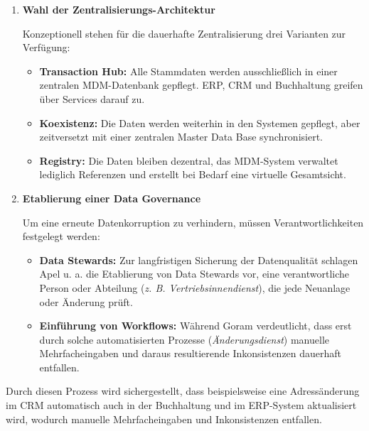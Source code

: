 \begin{enumerate}[label=\arabic*.), leftmargin=*]
\begin{itemize}
        \item \textbf{Festlegung des führenden Systems:} Hinsichtlich der Datenhoheit weist Gronau \cite[308]{4} darauf hin, dass bereits im Rahmen der Projektvorbereitung verbindlich entschieden werden muss, welches System für welche Informationen die primäre Hoheit besitzt. Goram \cite[36]{25} illustriert dies am Beispiel von Kundenstammsätzen: So könnte das \acs{CRM} für Marketingdaten federführend sein, während die Buchhaltung die Hoheit über zahlungsrelevante Informationen wie die Bankverbindung behält.
    \end{itemize}
    \item \textbf{Wahl der Zentralisierungs-Architektur} \par Konzeptionell stehen für die dauerhafte Zentralisierung drei Varianten zur Verfügung:
    \begin{itemize}
        \item \textbf{Transaction Hub:} Alle Stammdaten werden ausschließlich in einer zentralen \acs{MDM}-Datenbank gepflegt. \acs{ERP}, \acs{CRM} und Buchhaltung greifen über Services darauf zu.
        \item \textbf{Koexistenz:} Die Daten werden weiterhin in den Systemen gepflegt, aber zeitversetzt mit einer zentralen Master Data Base synchronisiert.
        \item \textbf{Registry:} Die Daten bleiben dezentral, das \acs{MDM}-System verwaltet lediglich Referenzen und erstellt bei Bedarf eine virtuelle Gesamtsicht.
    \end{itemize}
    \item \textbf{Etablierung einer Data Governance} \par Um eine erneute Datenkorruption zu verhindern, müssen Verantwortlichkeiten festgelegt werden:
    \begin{itemize}
        \item \textbf{Data Stewards:} Zur langfristigen Sicherung der Datenqualität schlagen Apel u. a. \cite[58]{26} die Etablierung von Data Stewards vor, eine verantwortliche Person oder Abteilung (\textit{\acs{z. B.} Vertriebsinnendienst}), die jede Neuanlage oder Änderung prüft.
        \item \textbf{Einführung von Workflows:} Während Goram \cite[42]{27} verdeutlicht, dass erst durch solche automatisierten Prozesse (\textit{Änderungsdienst}) manuelle Mehrfacheingaben und daraus resultierende Inkonsistenzen dauerhaft entfallen.
    \end{itemize}
\end{enumerate}
Durch diesen Prozess wird sichergestellt, dass beispielsweise eine Adressänderung im \acs{CRM} automatisch auch in der Buchhaltung und im \acs{ERP}-System aktualisiert wird, wodurch manuelle Mehrfacheingaben und Inkonsistenzen entfallen. \cite[75]{28}

